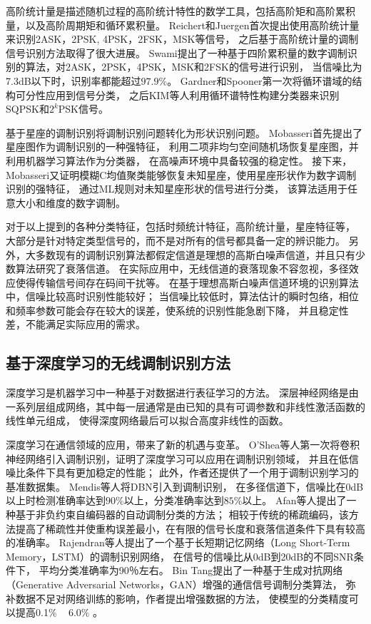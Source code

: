高阶统计量是描述随机过程的高阶统计特性的数学工具，包括高阶矩和高阶累积量，以及高阶周期矩和循环累积量。
Reichert和Juergen首次提出使用高阶统计量来识别2ASK，2PSK, 4PSK，2FSK，MSK等信号，
之后基于高阶统计量的调制信号识别方法取得了很大进展\cite{reichert1992automatic}。
Swami提出了一种基于四阶累积量的数字调制识别的算法，对2ASK，2PSK，4PSK，MSK和2FSK的信号进行识别，
当信噪比为7.3dB以下时，识别率都能超过$97.9\%$\cite{swami2000hierarchical}。
Gardner和Spooner第一次将循环谱域的结构可分性应用到信号分类，
之后KIM等人利用循环谱特性构建分类器来识别SQPSK和$2^k$PSK信号。\par

基于星座的调制识别将调制识别问题转化为形状识别问题。
Mobasseri首先提出了星座图作为调制识别的一种强特征，
利用二项非均匀空间随机场恢复星座图，并利用机器学习算法作为分类器，
在高噪声环境中具备较强的稳定性\cite{mobasseri1999constellation}。
接下来，Mobasseri又证明模糊C均值聚类能够恢复未知星座，使用星座形状作为数字调制识别的强特征，
通过ML规则对未知星座形状的信号进行分类，
该算法适用于任意大小和维度的数字调制\cite{mobasseri2000digital}。\par
 
对于以上提到的各种分类特征，包括时频统计特征，高阶统计量，星座特征等，
大部分是针对特定类型信号的，而不是对所有的信号都具备一定的辨识能力。
另外，大多数现有的调制识别算法都假定信道是理想的高斯白噪声信道，并且只有少数算法研究了衰落信道。
在实际应用中，无线信道的衰落现象不容忽视，多径效应使得传输信号间存在码间干扰等。
在基于理想高斯白噪声信道环境的识别算法中，信噪比较高时识别性能较好；
当信噪比较低时，算法估计的瞬时包络，相位和频率参数可能会存在较大的误差，使系统的识别性能急剧下降，
并且稳定性差，不能满足实际应用的需求。\par

\subsection{基于深度学习的无线调制识别方法}

深度学习是机器学习中一种基于对数据进行表征学习的方法。
深层神经网络是由一系列层组成网络，其中每一层通常是由已知的具有可调参数和非线性激活函数的线性单元组成，
使得深度网络最后可以拟合高度非线性的函数。\par
深度学习在通信领域的应用，带来了新的机遇与变革。
O'Shea等人第一次将卷积神经网络引入调制识别，证明了深度学习可以应用在调制识别领域，
并且在低信噪比条件下具有更加稳定的性能\cite{o2016convolutional}；
此外，作者还提供了一个用于调制识别学习的基准数据集\cite{o2016radio}。
Mendis等人将DBN引入到调制识别，
在多径信道下，信噪比在0dB以上时检测准确率达到$90\%$以上，分类准确率达到$85\%$以上\cite{mendis2016deep}。
Afan等人提出了一种基于非负约束自编码器的自动调制分类的方法\cite{ali2017automatic}；
相较于传统的稀疏编码，该方法提高了稀疏性并使重构误差最小，在有限的信号长度和衰落信道条件下具有较高的准确率。
Rajendran等人提出了一个基于长短期记忆网络（Long Short-Term Memory，LSTM）的调制识别网络，
在信号的信噪比从0dB到20dB的不同SNR条件下，
平均分类准确率为90％左右\cite{rajendran2017distributed}。
Bin Tang提出了一种基于生成对抗网络（Generative Adversarial Networks，GAN）增强的通信信号调制分类算法，
弥补数据不足对网络训练的影响，作者提出增强数据的方法，
使模型的分类精度可以提高0.1\% ~ 6.0\% \cite{8319926}。\par

